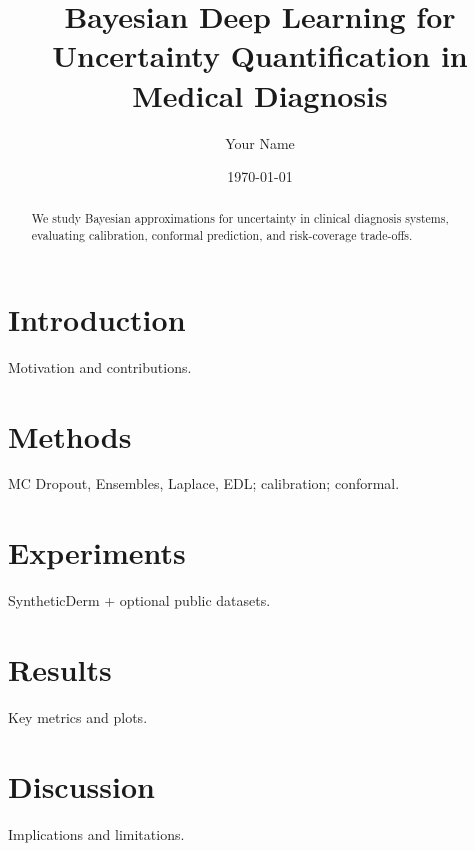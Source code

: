 \documentclass[10pt]{article}
\title{Bayesian Deep Learning for Uncertainty Quantification in Medical Diagnosis}
\author{Your Name}
\date{\today}
\begin{document}
\maketitle
\begin{abstract}
We study Bayesian approximations for uncertainty in clinical diagnosis systems,
evaluating calibration, conformal prediction, and risk-coverage trade-offs.
\end{abstract}
\section{Introduction}
Motivation and contributions.
\section{Methods}
MC Dropout, Ensembles, Laplace, EDL; calibration; conformal.
\section{Experiments}
SyntheticDerm + optional public datasets.
\section{Results}
Key metrics and plots.
\section{Discussion}
Implications and limitations.
\end{document}
